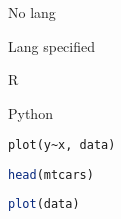 No lang 

Lang specified 

R 

Python 

\begin{lstlisting}[language=r exec]
plot(y~x, data)
\end{lstlisting}

\begin{lstlisting}[language=r, exec]
head(mtcars)
\end{lstlisting}

\begin{lstlisting}[language=r, exec, caption={
    A plot of the data which has a mean of \lstinline[language=r exec]{ mean(data) }
}, label=fig2]
plot(data)
\end{lstlisting}
